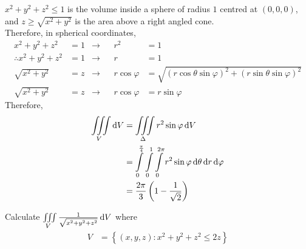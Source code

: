 \documentclass[fleqn, a4paper, 12pt, twoside]{article}
\theoremstyle{definition}
\theoremstyle{theorem}
\begin{document}
\begin{solution}
	$x^2 + y^2 + z^2 \le 1$ is the volume inside a sphere of radius $1$ centred at $(0,0,0)$, and $z \ge \sqrt{x^2 + y^2}$ is the area above a right angled cone.\\
	Therefore, in spherical coordinates,
	\begin{align*}
		x^2 + y^2 + z^2            & = 1 & \to &  & r^2            & = 1                                                                      \\
		\therefore x^2 + y^2 + z^2 & = 1 & \to &  & r              & = 1                                                                      \\
		\sqrt{x^2 + y^2}           & = z & \to &  & r \cos \varphi & = \sqrt{(r \cos \theta \sin \varphi)^2 + (r \sin \theta \sin \varphi)^2} \\
		\sqrt{x^2 + y^2}           & = z & \to &  & r \cos \varphi & = r \sin \varphi
	\end{align*}
	Therefore,
	\begin{align*}
		\iiint\limits_{V} \dif V & = \iiint\limits_{\Delta} r^2 \sin \varphi \dif V                                                                               \\
                                         & = \int\limits_{0}^{\frac{\pi}{4}} \int\limits_{0}^{1} \int\limits_{0}^{2 \pi} r^2 \sin \varphi \dif \theta \dif r \dif \varphi \\
                                         & = \frac{2 \pi}{3} \left( 1 - \frac{1}{\sqrt{2}} \right)
	\end{align*}
\end{solution}

\begin{question}
	Calculate $\iiint\limits_{V} \frac{1}{\sqrt{x^2 + y^2 + z^2}} \dif V$ where
	\begin{align*}
		V & = \left\{ (x,y,z) : x^2 + y^2 + z^2 \le 2 z \right\}
	\end{align*}
\end{question}
\end{document}
